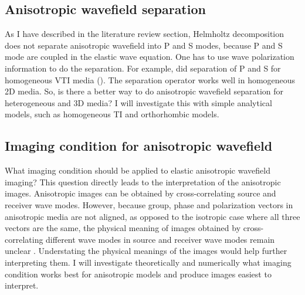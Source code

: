 \subsection{Anisotropic wavefield separation}
As I have described in the literature review section, Helmholtz decomposition does not separate anisotropic wavefield into P and S modes, because P and S mode are coupled in the elastic wave equation. One has to use wave polarization information to do the separation. For example, \cite{GEO55-07-09140919} did separation of P and S for homogeneous VTI media (). The separation operator works well in homogeneous 2D media. So, is there a better way to do anisotropic wavefield separation for heterogeneous and 3D media? 
I will investigate this with simple analytical models, such as homogeneous TI and orthorhombic models.


\subsection{Imaging condition for anisotropic wavefield}
What imaging condition should be applied to elastic anisotropic wavefield imaging? This question directly leads to the interpretation of the anisotropic images. 
Anisotropic images can be obtained by cross-correlating source and receiver wave modes. However, because group, phase and polarization vectors in anisotropic media are not aligned, as opposed to the isotropic case where all three vectors are the same, the physical meaning of images obtained by cross-correlating different wave modes in source and receiver wave modes remain unclear . Understating the physical meanings of the images would help further interpreting them. I will investigate theoretically and numerically what imaging condition works best for anisotropic models and produce images easiest to interpret.

